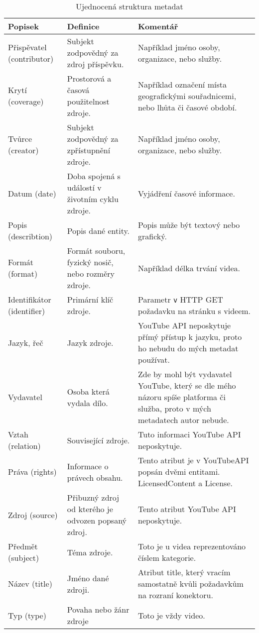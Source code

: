 \begin{table}[h!]
\begin{tabular}{|p{} | p{} | p{}|}
\hline
Popisek & Definice & Komentář\\
\hline
Přispěvatel (contributor) & Subjekt zodpovědný za zdroj příspěvku. & Například jméno osoby, organizace, nebo služby.\\
\hline
Krytí (coverage) & Prostorová a časová použitelnost zdroje. & Například označení místa geografickými souřadnicemi, nebo lhůta či časové období.\\
\hline
Tvůrce (creator) & Subjekt zodpovědný za zpřístupnění zdroje. & Například jméno osoby, organizace, nebo služby.\\
\hline
Datum (date) & Doba spojená s událostí v životním cyklu zdroje. & Vyjádření časové informace. \\
\hline
Popis (describtion) & Popis dané entity. & Popis může být textový nebo grafický. \\
\hline
Formát (format) & Formát souboru, fyzický nosič, nebo rozměry zdroje. & Například délka trvání videa. \\
\hline
Identifikátor (identifier) & Primární klíč zdroje. & Parametr \texttt{v} HTTP GET požadavku na stránku s videem.\\
\hline
Jazyk, řeč & Jazyk zdroje. & YouTube API neposkytuje přímý přístup k jazyku, proto ho nebudu do mých metadat používat.\\
\hline
Vydavatel & Osoba která vydala dílo. & Zde by mohl být vydavatel YouTube, který se dle mého názoru spíše platforma či služba, proto v mých metadatech autor nebude.\\
\hline
Vztah (relation) & Související zdroje. & Tuto informaci YouTube API neposkytuje.\\
\hline
Práva (rights) & Informace o právech obsahu. & Tento atribut je v YouTubeAPI popsán dvěmi entitami. LicensedContent a License.\\
\hline
Zdroj (source) & Přibuzný zdroj od kterého je odvozen popsaný zdroj. & Tento atribut YouTube API neposkytuje.\\
\hline
Předmět (subject) & Téma zdroje. & Toto je u videa reprezentováno číslem kategorie.\\
\hline
Název (title) & Jméno dané zdroji. & Atribut title, který vracím samostatně kvůli požadavkům na rozraní konektoru.\\
\hline
Typ (type) & Povaha nebo žánr zdroje & Toto je vždy video.\\
\hline
\end{tabular}
\caption[DublinCore metadata]{Ujednocená struktura metadat}\label{tab:dublincore1}
\end{table}
\hfill